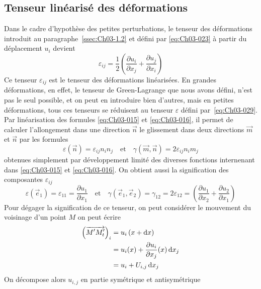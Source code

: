\subsection{Tenseur linéarisé des déformations} \label{ssec:Ch03-2.2}
Dans le cadre d'hypothèse des petites perturbations, le tenseur des déformations introduit au paragraphe~\ref{ssec:Ch03-1.2} et défini par \eqref{eq:Ch03-023} à partir du déplacement $u_i$ devient
\begin{equation}
    \varepsilon_{ij} = \frac{1}{2} \left( \frac{\partial u_i}{\partial x_j} + \frac{\partial u_j}{\partial x_i} \right)
    \label{eq:Ch03-029}
\end{equation}
Ce tenseur $\varepsilon_{ij}$ est le tenseur des déformations linéarisées.
En grandes déformations, en effet, le tenseur de Green-Lagrange que nous avons défini, n'est pas le seul possible, et on peut en introduire bien d'autres, mais en petites déformations, tous ces tenseurs se réduisent au tenseur $\mathbb{\varepsilon}$ défini par~\eqref{eq:Ch03-029}.
Par linéarisation des formules \eqref{eq:Ch03-015} et \eqref{eq:Ch03-016}, il permet de calculer l'allongement dans une direction $\vec{n}$ le glissement dans deux directions $\vec{m}$ et $\vec{n}$ par les formules
\begin{equation}
\varepsilon (\vec{n}) = \varepsilon_{ij} n_i n_j\quad\text{et}\quad\gamma(\vec{m},\vec{n}) = 2 \varepsilon_{ij} n_i m_j \label{eq:Ch03-031} 
\end{equation}
obtenues simplement par développement limité des diverses fonctions internenant dans \eqref{eq:Ch03-015} et \eqref{eq:Ch03-016}.
On obtient aussi la signification des composantes $\varepsilon_{ij}$
\begin{equation}
    \varepsilon (\vec{e}_1) = \varepsilon_{11} = \frac{\partial u_1}{\partial x_1} \quad\text{et}\quad 
    \gamma (\vec{e}_1,\vec{e}_2) = \gamma_{12} = 2 \varepsilon_{12} = \left( \frac{\partial u_1}{\partial x_2} + \frac{\partial u_2}{\partial x_1} \right) \label{eq:Ch03-033}
\end{equation}
Pour dégager la signification de ce tenseur, on peut considérer le mouvement du voisinage d'un point $M$ on peut écrire
\begin{align*}
    \left( \overrightarrow{M'M_t'} \right)_i &= u_i \left( x + \mathop{\mathrm{{}d}}\mathopen{} x \right) \\
    &= u_i (x) + \frac{\partial u_i}{\partial x_j} (x) \mathop{\mathrm{{}d}}\mathopen{} x_j\\
    &= u_i + U_{i,j} \mathop{\mathrm{{}d}}\mathopen{} x_j
\end{align*}
On décompose alors $u_{i,j}$ en partie symétrique et antisymétrique
